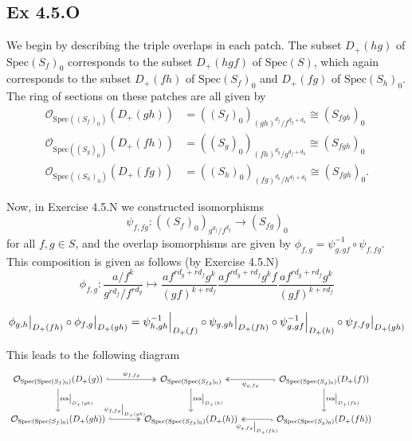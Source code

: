 \documentclass{article}
\newcommand\restr[2]{{%
  \left.\kern-\nulldelimiterspace %
  #1 %
  \vphantom{\big|} %
  \right|_{#2} %
  }}
\theoremstyle{definition}
\newcommand{\oo}{\mathcal{O}}
\newcommand{\osp}[1]{\oo_{\Spec\left(#1\right)}}
\newcommand{\Spec}{\text{Spec}}
\begin{document}
\subsection*{Ex 4.5.O}

We begin by describing the triple overlaps in each patch. The subset
$D_{+}(hg)$ of $\Spec(S_f)_0$ corresponds to the subset $D_{+}(hgf)$ of
$\Spec(S)$, which again corresponds to the subset $D_{+}(fh)$ of
$\Spec(S_{f})_0$ and $D_{+}(fg)$ of $\Spec(S_h)_0$. The ring of sections on
these patches are all given by 
\begin{align*}
	\osp{(S_f)_0}(D_{+}(gh)) &= ((S_f)_0)_{(gh)^{d_f} / f^{d_g + d_h}} \cong (S_{fgh})_0  \\
	\osp{(S_g)_0}(D_{+}(fh)) &= ((S_g)_0)_{(fh)^{d_g} / g^{d_f + d_h}} \cong (S_{fgh})_0  \\
	\osp{(S_h)_0}(D_{+}(fg)) &= ((S_h)_0)_{(fg)^{d_h} / h^{d_f + d_g}} \cong (S_{fgh})_0.
\end{align*}

Now, in Exercise 4.5.N we constructed isomorphisms
\[
	\psi_{f, fg} 
	:
	((S_f)_0)_{g^{d_f}/f^{d_g}}
	\to
	(S_{fg})_0
\]
for all $f, g \in S$, and the overlap isomorphisms are given by $\phi_{f, g} =
\psi_{g, gf}^{-1} \circ \psi_{f, fg}$. This composition is given as follows (by
Exercise 4.5.N)
\[
	\phi_{f, g}
	:
	\frac{a/f^k}{g^{r d_f} / f^{r d_g}}
	\mapsto
	\frac{a f^{r d_g + r d_f} g^k}{(gf)^{k + r d_f}}
	\frac{a f^{r d_g + r d_f} g^k f}{}
	\frac{a f^{r d_g + r d_f} g^k}{(gf)^{k + r d_f}}
\] 

\[
	\restr{\phi_{g, h}}{D_{+}(fh)} 
	\circ
	\restr{\phi_{f, g}}{D_{+}(gh)} 
	=
	\restr{\psi_{h, gh}^{-1}}{D_{+}(f)} \circ \restr{\psi_{g, gh}}{D_{+}(fh)}
	\circ
	\restr{\psi_{g, gf}^{-1}}{D_{+}(h)} \circ \restr{\psi_{f, fg}}{D_{+}(gh)}
\]

This leads to the following diagram 
\[
	\begin{tikzcd}[row sep=large, column sep = large]
		\osp{\Spec(S_f)_0}(D_+(g))
			\arrow[hook, two heads, r, "\psi_{f, fg}"]
			\arrow[d, "\restr{\text{res}}{D_{+}(gh)}"] 
			&
		\osp{\Spec(S_{fg})_0}
			\arrow[d, "\restr{\text{res}}{D_{+}(h)}"] 
			&
		\osp{\Spec(S_g)_0}(D_+(f))
			\arrow[hook, two heads, l, "\psi_{g, fg}"] 
			\arrow[d, "\restr{\text{res}}{D_{+}(fh)}"] 
			& 
			\\
		\osp{\Spec(S_f)_0}(D_+(gh))
			\arrow[hook, two heads, r, "\restr{\psi_{f, fg}}{D_{+}(gh)}"]
			&
		\osp{\Spec(S_{fg})_0}(D_{+}(h))
			&
		\osp{\Spec(S_g)_0}(D_+(fh))
			\arrow[hook, two heads, l, "\restr{\psi_{g, fg}}{D_{+}(fh)}"]
			&
	\end{tikzcd}
\] 
\end{document}
